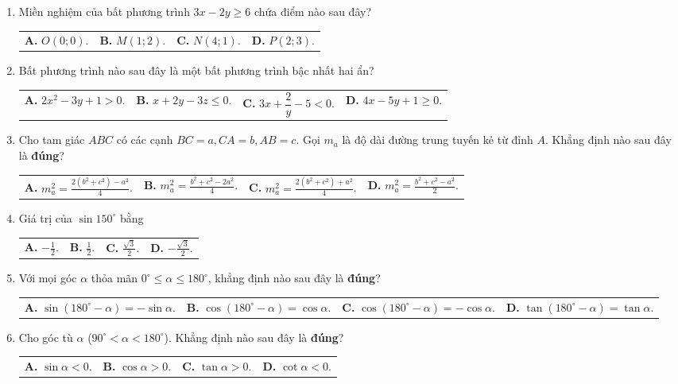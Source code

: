 \documentclass[12pt,a4paper]{article}
\makeatletter
\newcommand{\four}[4]{\par\noindent\begin{tabularx}{\linewidth}{@{}*{4}{>{\raggedright\arraybackslash}X}@{}}\textbf{A.} #1&\textbf{B.} #2&\textbf{C.} #3&\textbf{D.} #4\end{tabularx}}
\makeatother
\begin{document}
\begin{enumerate}
\item Miền nghiệm của bất phương trình $3x - 2y \ge 6$ chứa điểm nào sau đây?
\four{$O(0; 0)$.}{$M(1; 2)$.}{$N(4; 1)$.}{$P(2; 3)$.}

\item Bất phương trình nào sau đây là một bất phương trình bậc nhất hai ẩn?
\four{$2x^2 - 3y + 1 > 0$.}{$x + 2y - 3z \le 0$.}{$3x + \dfrac{2}{y} - 5 < 0$.}{$4x - 5y + 1 \ge 0$.}

\item Cho tam giác $ABC$ có các cạnh $BC = a, CA = b, AB = c$. Gọi $m_a$ là độ dài đường trung tuyến kẻ từ đỉnh $A$. Khẳng định nào sau đây là \textbf{đúng}?
\four{$m_a^2 = \tfrac{2(b^2 + c^2) - a^2}{4}$.}{$m_a^2 = \tfrac{b^2 + c^2 - 2a^2}{4}$.}{$m_a^2 = \tfrac{2(b^2 + c^2) + a^2}{4}$.}{$m_a^2 = \tfrac{b^2 + c^2 - a^2}{2}$.}

\item Giá trị của $\sin 150^\circ$ bằng
\four{$-\tfrac{1}{2}$.}{$\tfrac{1}{2}$.}{$\tfrac{\sqrt{3}}{2}$.}{$-\tfrac{\sqrt{3}}{2}$.}

\item Với mọi góc $\alpha$ thỏa mãn $0^\circ \le \alpha \le 180^\circ$, khẳng định nào sau đây là \textbf{đúng}?
\four{$\sin(180^\circ - \alpha) = -\sin \alpha$.}{$\cos(180^\circ - \alpha) = \cos \alpha$.}{$\cos(180^\circ - \alpha) = -\cos \alpha$.}{$\tan(180^\circ - \alpha) = \tan \alpha$.}

\item Cho góc tù $\alpha$ ($90^\circ < \alpha < 180^\circ$). Khẳng định nào sau đây là \textbf{đúng}?
\four{$\sin \alpha < 0$.}{$\cos \alpha > 0$.}{$\tan \alpha > 0$.}{$\cot \alpha < 0$.}
\end{enumerate}
\end{document}
